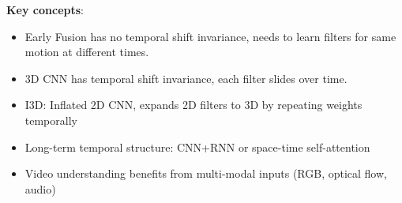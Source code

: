 \documentclass{article}
\begin{document}
\begin{multicols}{3}
\textbf{Key concepts}:
\begin{itemize}
\item Early Fusion has no temporal shift invariance, needs to learn filters for same motion at different times.
\item 3D CNN has temporal shift invariance, each filter slides over time.
\item I3D: Inflated 2D CNN, expands 2D filters to 3D by repeating weights temporally
\item Long-term temporal structure: CNN+RNN or space-time self-attention
\item Video understanding benefits from multi-modal inputs (RGB, optical flow, audio)
\end{itemize}

\end{multicols}
\end{document}
